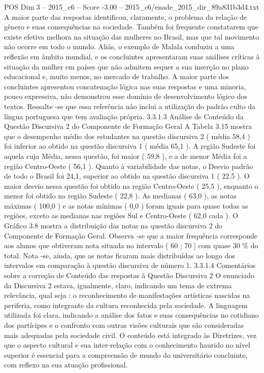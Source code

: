 \begin{textsample}{POS Dim 3 – 2015\_c6 – Score -3.00 – 2015\_c6/enade\_2015\_dir\_89a831b3d4.txt}
A maior parte das respostas identificou, claramente, o problema da relação de gênero e suas consequências na sociedade.
Também foi frequente constatarem que existe efetiva melhora na situação das mulheres no Brasil, mas que tal movimento não ocorre em todo o mundo.
Aliás, o exemplo de Malala conduziu a uma reflexão em âmbito mundial, e os concluintes apresentaram suas análises críticas à situação da mulher em países que não admitem sequer a sua inserção no plano educacional e, muito menos, no mercado de trabalho.
A maior parte dos concluintes apresentou concatenação lógica nas suas respostas e uma minoria, pouco expressiva, não demonstrou esse domínio de desenvolvimento lógico dos textos.
Ressalte -se que essa referência não inclui a utilização do padrão culto da língua portuguesa que tem avaliação própria. 3.3.1.3 Análise de Conteúdo da Questão Discursiva 2 do Componente de Formação Geral A Tabela 3.15 mostra que o desempenho médio dos estudantes na questão discursiva 2 ( média 58,4 ) foi inferior ao obtido na questão discursiva 1 ( média 65,1 ).
A região Sudeste foi aquela cuja Média, nessa questão, foi maior ( 59,8 ), e a de menor Média foi a região Centro-Oeste ( 56,1 ).
Quanto à variabilidade das notas, o Desvio padrão de todo o Brasil foi 24,1, superior ao obtido na questão discursiva 1 ( 22,5 ).
O maior desvio nessa questão foi obtido na região Centro-Oeste ( 25,5 ), enquanto o menor foi obtido na região Sudeste ( 22,8 ).
As medianas ( 63,0 ), as notas máximas ( 100,0 ) e as notas mínimas ( 0,0 ) foram iguais para quase todas as regiões, exceto as medianas nas regiões Sul e Centro-Oeste ( 62,0 cada ).
O Gráfico 3.8 mostra a distribuição das notas na questão discursiva 2 do Componente de Formação Geral.
Observa -se que a maior frequência corresponde aos alunos que obtiveram nota situada no intervalo ( 60 ; 70 ] com quase 30 \% do total.
Nota -se, ainda, que as notas ficaram mais distribuídas ao longo dos intervalos em comparação à questão discursiva de número 1. 3.3.1.4 Comentários sobre a correção de Conteúdo das respostas à Questão Discursiva 2 O enunciado da Discursiva 2 estava, igualmente, claro, indicando um tema de extrema relevância, qual seja : o reconhecimento de manifestações artísticas nascidas na periferia, como integrante da cultura reconhecida pela sociedade.
A linguagem utilizada foi clara, indicando a análise dos fatos e suas consequências no cotidiano dos partícipes e o confronto com outras visões culturais que são consideradas mais adequadas pela sociedade civil.
O conteúdo está integrado às Diretrizes, vez que o aspecto cultural e sua inter-relação com o conhecimento haurido no nível superior é essencial para a compreensão de mundo do universitário concluinte, com reflexo na sua atuação profissional.

\end{textsample}
